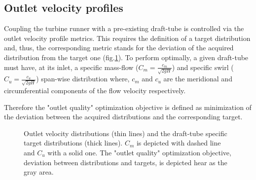 \subsection{Outlet velocity profiles}
Coupling the turbine runner with a pre-existing draft-tube is controlled via the outlet velocity profile metrics. This requires the definition of a target distribution and, thus, the corresponding metric stands for the deviation of the acquired distribution from the target one (fig.\ref{design-obj2}). To perform optimally, a given draft-tube must have, at its inlet, a specific mass-flow ($C_m=\frac{c_m}{\sqrt{2gH}}$) and  specific swirl ($C_u=\frac{c_u}{\sqrt{2gH}}$) span-wise distribution where, $c_m$ and $c_u$ are the meridional and circumferential components of the flow velocity respectively.


Therefore the  "outlet quality" optimization objective is defined as minimization of the deviation between the acquired distributions and the corresponding target. 

\begin{figure}[h!]
\begin{minipage}[b]{1\linewidth}
 \centering
\end{minipage}
\caption{Outlet velocity distributions (thin lines) and the draft-tube specific target distributions (thick lines). $C_m$ is depicted with dashed line and $C_u$ with a solid one. The "outlet quality" optimization objective, deviation between distributions and targets, is depicted hear as the gray area.}
\label{design-obj2}
\end{figure}

